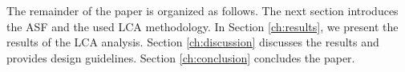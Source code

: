 The remainder of the paper is organized as follows. The next section introduces the ASF and the used LCA methodology. In Section \ref{ch:results}, we present the results of the LCA analysis. Section \ref{ch:discussion} discusses the results and provides design guidelines. Section \ref{ch:conclusion} concludes the paper.








